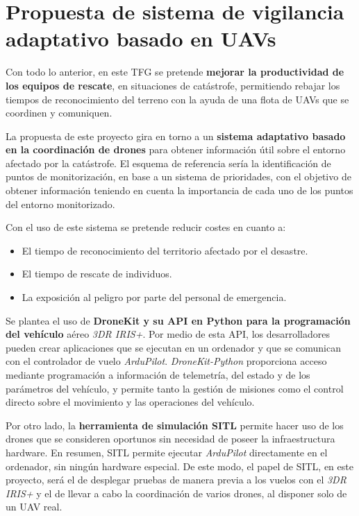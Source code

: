 \section{Propuesta de sistema de vigilancia adaptativo basado en \acs{UAV}s}

Con todo lo anterior, en este \acs{TFG} se pretende \textbf{mejorar la productividad de los equipos de rescate}, en situaciones de catástrofe, permitiendo rebajar los tiempos de reconocimiento del terreno con la ayuda de una flota de \acs{UAV}s que se coordinen y comuniquen.

La propuesta de este proyecto gira en torno a un \textbf{sistema adaptativo basado en la coordinación de drones} para obtener información útil sobre el entorno afectado por la catástrofe. El esquema de referencia sería la identificación de puntos de monitorización, en base a un sistema de prioridades, con el objetivo de obtener información teniendo en cuenta la importancia de cada uno de los puntos del entorno monitorizado.

Con el uso de este sistema se pretende reducir costes en cuanto a: 
\begin{itemize}
\item El tiempo de reconocimiento del territorio afectado por el desastre.
\item El tiempo de rescate de individuos.
\item La exposición al peligro por parte del personal de emergencia.
\end{itemize}

Se plantea el uso de \textbf{DroneKit y su \acs{API} en Python para la programación del vehículo} aéreo \textit{3DR IRIS+}. Por medio de esta \acs{API}, los desarrolladores pueden crear aplicaciones que se ejecutan en un ordenador y que se comunican con el controlador de vuelo \textit{ArduPilot}. \textit{DroneKit-Python} proporciona acceso mediante programación a información de telemetría, del estado y de los parámetros del vehículo, y permite tanto la gestión de misiones como el control directo sobre el movimiento y las operaciones del vehículo.

Por otro lado, la \textbf{herramienta de simulación \acs{SITL}} permite hacer uso de los drones que se consideren oportunos sin necesidad de poseer la infraestructura hardware. En resumen, \acs{SITL} permite ejecutar \textit{ArduPilot} directamente en el ordenador, sin ningún hardware especial. De este modo, el papel de \acs{SITL}, en este proyecto, será el de desplegar pruebas de manera previa a los vuelos con el \textit{3DR IRIS+} y el de llevar a cabo la coordinación de varios drones, al disponer solo de un \acs{UAV} real.

